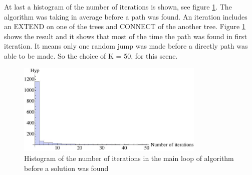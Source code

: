 At last a histogram of the number of iterations is shown, see figure \ref{fig:k}. The algorithm was taking in average before a path was found. An iteration includes an EXTEND on one of the trees and CONNECT of the another tree. 
Figure \ref{fig:k} shows the result and it shows that most of the time the path was found in first iteration. It means only one random jump was made before a directly path was able to be made. So the choice of K = 50, for this scene.

\begin{figure}[h!]
 \centering
 \includegraphics[width=0.8\textwidth]{images/K.jpg}
 \caption{Histogram of the number of iterations in the main loop of algorithm before a solution was found}
 \label{fig:k}
\end{figure}